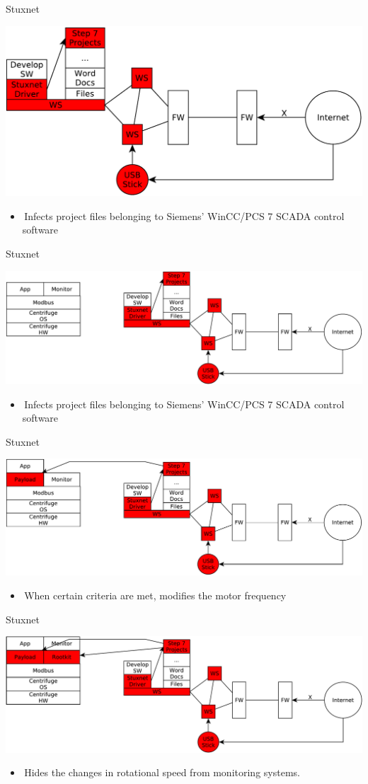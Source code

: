 \documentclass{beamer}
\begin{document}
\begin{frame}{Stuxnet}
  \begin{center}
    \includegraphics[width=0.7\linewidth]{stuxnet6}
    \begin{itemize}
    \item Infects project files belonging to Siemens' WinCC/PCS 7 SCADA control software
    \end{itemize}
  \end{center}
\end{frame}

\begin{frame}{Stuxnet}
  \begin{center}
    \includegraphics[width=0.7\linewidth]{stuxnet7}
    \begin{itemize}
    \item Infects project files belonging to Siemens' WinCC/PCS 7 SCADA control software
    \end{itemize}
  \end{center}
\end{frame}

\begin{frame}{Stuxnet}
  \begin{center}
    \includegraphics[width=0.7\linewidth]{stuxnet8}
    \begin{itemize}
    \item When certain criteria are met, modifies the motor frequency
    \end{itemize}
  \end{center}
\end{frame}

\begin{frame}{Stuxnet}
  \begin{center}
    \includegraphics[width=0.7\linewidth]{stuxnet9}
    \begin{itemize}
    \item Hides the changes in rotational speed from monitoring systems.
    \end{itemize}
  \end{center}
\end{frame}
\end{document}
